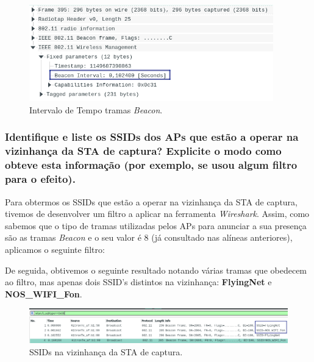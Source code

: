     \begin{figure}[H]
    \centering
    \includegraphics[width=300pt]{Prints/Questao5/questao2-IntervTempo.png}
    \caption{Intervalo de Tempo tramas \textit{Beacon}.} \label{questao5-InterTempo}
    \end{figure}




\vspace{15pt}
\subsubsection{Identifique e liste os SSIDs dos APs que estão a operar na vizinhança da STA de captura? Explicite o modo como obteve esta informação (por exemplo, se usou algum filtro para o efeito).}

    \par Para obtermos os SSIDs que estão a operar na vizinhança da STA de captura, tivemos de desenvolver um filtro a aplicar na ferramenta \textit{Wireshark}. Assim, como sabemos que o tipo de tramas utilizadas pelos APs para anunciar a sua presença são as tramas \textit{Beacon} e o seu valor é 8 (já consultado nas alíneas anteriores), aplicamos o seguinte filtro:
    
    \vspace{10pt}
    \begin{minipage}{\linewidth}
        \centering
    \end{minipage}

    \vspace{10pt}
    \par De seguida, obtivemos o seguinte resultado notando várias tramas que obedecem ao filtro, mas apenas dois SSID's distintos na vizinhança: \textbf{FlyingNet} e \textbf{NOS\_WIFI\_Fon}. 

    \begin{figure}[H]
    \centering
    \includegraphics[width=\linewidth]{Prints/Questao5/questao5-SSID.png}
    \caption{SSIDs na vizinhança da STA de captura.} \label{questao5-SSID}
    \end{figure}
    
